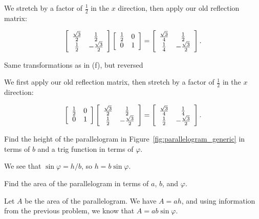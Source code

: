 \documentclass[../key.tex]{subfiles}
\begin{document}
We stretch by a factor of $\frac{1}{2}$ in the $x$ direction, then apply our old reflection matrix:

$$\left[\begin{array}{cc} \frac{\sqrt{3}}{2} & \frac{1}{2} \\ \frac{1}{2} & -\frac{\sqrt{3}}{2} \end{array}\right]\left[\begin{array}{cc} \frac{1}{2} & 0 \\ 0 & 1 \end{array}\right] = \left[\begin{array}{cc} \frac{\sqrt{3}}{4} & \frac{1}{2} \\ \frac{1}{4} & -\frac{\sqrt{3}}{2} \end{array}\right].$$

\begin{inner_problem}
\item Same transformations as in (f), but reversed \label{prob:matrix_prod_end}
\end{inner_problem}

We first apply our old reflection matrix, then stretch by a factor of $\frac{1}{2}$ in the $x$ direction:

$$\left[\begin{array}{cc} \frac{1}{2} & 0 \\ 0 & 1 \end{array}\right]\left[\begin{array}{cc} \frac{\sqrt{3}}{2} & \frac{1}{2} \\ \frac{1}{2} & -\frac{\sqrt{3}}{2} \end{array}\right] = \left[\begin{array}{cc} \frac{\sqrt{3}}{4} & \frac{1}{4} \\ \frac{1}{2} & -\frac{\sqrt{3}}{2} \end{array}\right].$$

\begin{outer_problem}
\item
\end{outer_problem}

\begin{inner_problem}[start=1]
\item Find the height of the parallelogram in Figure~\ref{fig:parallelogram_generic} in terms of $b$ and a trig function in terms of $\varphi$.
\end{inner_problem}

We see that $\sin\varphi = h/b$, so $h = b\sin\varphi$.

\begin{inner_problem}
\item Find the area of the parallelogram in terms of $a$, $b$, and $\varphi$.
\end{inner_problem}

Let $A$ be the area of the parallelogram. We have $A=ah$, and using information from the previous problem, we know that $A = ab\sin\varphi$.
\end{document}
